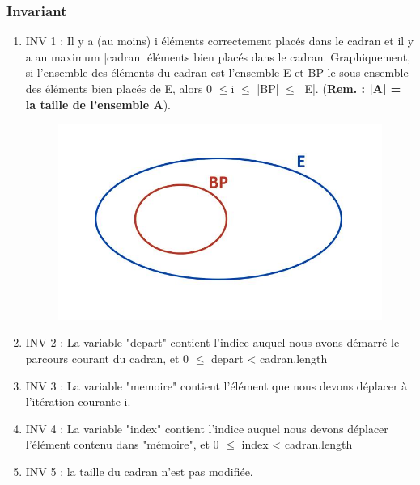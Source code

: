 \documentclass[a4paper, 12pt]{article}
\begin{document}
\subsubsection*{Invariant}

\vspace{0.2cm}

\begin{enumerate}
\item INV 1 : Il y a (au moins) i éléments correctement placés dans le cadran et il y a au maximum |cadran| éléments bien placés dans le cadran.
Graphiquement, si l'ensemble des éléments du cadran est l'ensemble E et BP le sous ensemble des éléments bien placés de E, alors 0 $\le$i $\le$ |BP| $\le$ |E|. (\textbf{Rem. : |A| = la taille de l'ensemble A}).\\

\begin{figure}[h]
   \includegraphics[scale=0.5]{Ensembles}
\end{figure}


\item INV 2 : La variable "depart" contient l'indice auquel nous avons démarré le parcours courant du cadran, et 0 $\le$ depart < cadran.length

\item INV 3 : La variable "memoire" contient l'élément que nous devons déplacer à l'itération courante i.

\item INV 4 : La variable "index" contient l'indice auquel nous devons déplacer l'élément contenu dans "mémoire", et 0 $\le$ index < cadran.length

\item INV 5 : la taille du cadran n'est pas modifiée.
\end{enumerate}
\end{document}
